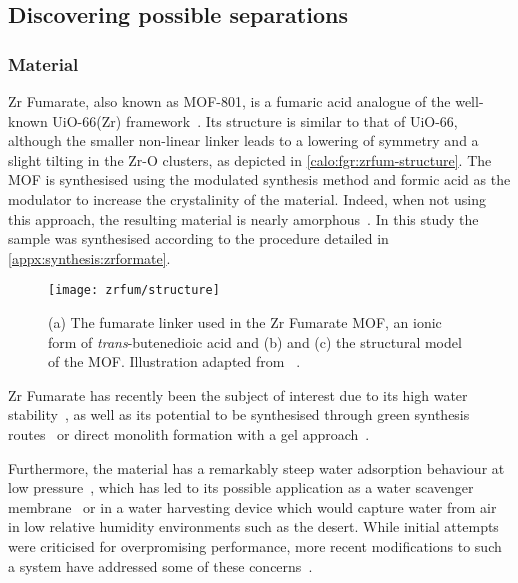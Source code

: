 
\subsection{Discovering possible separations}

\subsubsection{Material}

Zr Fumarate, also known as MOF-801, is a fumaric 
acid analogue of the well-known UiO-66(Zr) 
framework~\cite{wissmannModulatedSynthesisZrfumarate2012}.
Its structure is similar to that of UiO-66, although 
the smaller non-linear linker leads to a lowering of 
symmetry and a slight tilting in the Zr-O clusters,
as depicted in \autoref{calo:fgr:zrfum-structure}.
The MOF is synthesised using the modulated synthesis method and 
formic acid as the modulator to increase the crystalinity of the
material. Indeed, when not using this approach, the resulting
material is nearly amorphous~\cite{zahnInsightMechanismModulated2014}.
In this study the sample was synthesised according to the procedure 
detailed in \autoref{appx:synthesis:zrformate}.

\begin{figure}[htb]
    \centering
    \texttt{[image: zrfum/structure]}%
    \caption{(a) The fumarate linker used in the Zr Fumarate
    MOF, an ionic form of \textit{trans}-butenedioic acid and
    (b) and (c) the structural model of the MOF. Illustration
    adapted from~\citeauthor{wissmannModulatedSynthesisZrfumarate2012}%
    \cite{wissmannModulatedSynthesisZrfumarate2012}.}%
    \label{calo:fgr:zrfum-structure}
\end{figure}

Zr Fumarate has recently been the subject of interest due to its
high water stability~\cite{zahnWaterbornZrbasedPorous2015}, 
as well as its potential to be synthesised through green synthesis
routes~\cite{reinschFacileGreenRoute2016} or direct
monolith formation with a gel approach~\cite{buekenGelbasedMorphologicalDesign2017}.

Furthermore, the material has a remarkably steep water adsorption
behaviour at low pressure~\cite{furukawaWaterAdsorptionPorous2014},
which has led to its possible application as a water scavenger 
membrane~\cite{baeTransparentMetalOrganic2016} or in a water 
harvesting device which would capture water from air in low relative
humidity environments such as the desert. While initial 
attempts~\cite{kimWaterHarvestingAir2017} were criticised for
overpromising performance, more recent modifications to such 
a system have addressed some of these 
concerns~\cite{kimAdsorptionbasedAtmosphericWater2018}.


